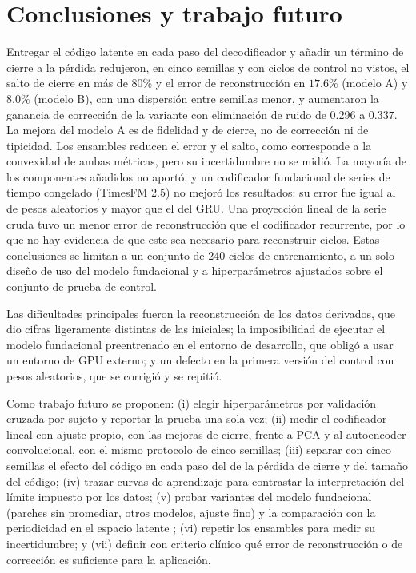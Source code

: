 \documentclass[11pt,a4paper]{article}
\begin{document}
\section{Conclusiones y trabajo futuro}
\label{sec:conclusiones}

Entregar el código latente en cada paso del decodificador y añadir un término de cierre a la pérdida redujeron, en cinco semillas y con ciclos de control no vistos, el salto de cierre en más de $80\%$ y el error de reconstrucción en $17.6\%$ (modelo A) y $8.0\%$ (modelo B), con una dispersión entre semillas menor, y aumentaron la ganancia de corrección de la variante con eliminación de ruido de $0.296$ a $0.337$. La mejora del modelo A es de fidelidad y de cierre, no de corrección ni de tipicidad. Los ensambles reducen el error y el salto, como corresponde a la convexidad de ambas métricas, pero su incertidumbre no se midió. La mayoría de los componentes añadidos no aportó, y un codificador fundacional de series de tiempo congelado (TimesFM 2.5) no mejoró los resultados: su error fue igual al de pesos aleatorios y mayor que el del GRU. Una proyección lineal de la serie cruda tuvo un menor error de reconstrucción que el codificador recurrente, por lo que no hay evidencia de que este sea necesario para reconstruir ciclos. Estas conclusiones se limitan a un conjunto de 240 ciclos de entrenamiento, a un solo diseño de uso del modelo fundacional y a hiperparámetros ajustados sobre el conjunto de prueba de control.

Las dificultades principales fueron la reconstrucción de los datos derivados, que dio cifras ligeramente distintas de las iniciales; la imposibilidad de ejecutar el modelo fundacional preentrenado en el entorno de desarrollo, que obligó a usar un entorno de GPU externo; y un defecto en la primera versión del control con pesos aleatorios, que se corrigió y se repitió.

Como trabajo futuro se proponen: (i) elegir hiperparámetros por validación cruzada por sujeto y reportar la prueba una sola vez; (ii) medir el codificador lineal con ajuste propio, con las mejoras de cierre, frente a PCA y al autoencoder convolucional, con el mismo protocolo de cinco semillas; (iii) separar con cinco semillas el efecto del código en cada paso del de la pérdida de cierre y del tamaño del código; (iv) trazar curvas de aprendizaje para contrastar la interpretación del límite impuesto por los datos; (v) probar variantes del modelo fundacional (parches sin promediar, otros modelos, ajuste fino) y la comparación con la periodicidad en el espacio latente \cite{starke2022}; (vi) repetir los ensambles para medir su incertidumbre; y (vii) definir con criterio clínico qué error de reconstrucción o de corrección es suficiente para la aplicación.
\end{document}

